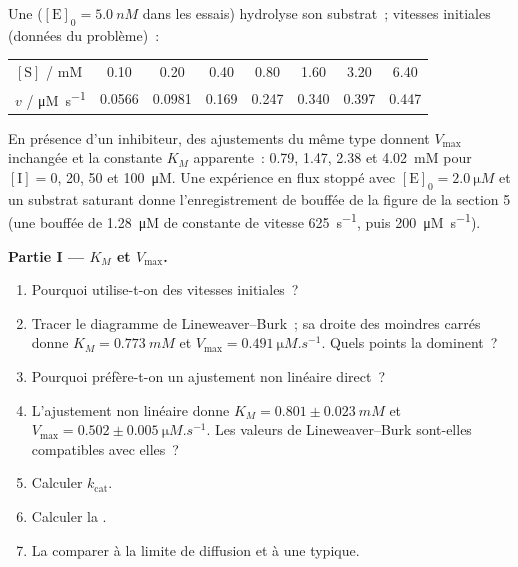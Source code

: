 \begin{problem}
\label{pb:b3:complex-kinetics:1}
Une  ($[\mathrm E]_0 = \qty{5.0}{nM}$ dans les essais) hydrolyse
son substrat~; vitesses initiales
(données du problème)~:
\begin{center}\small
\begin{tabular}{lccccccc}
\hline
$[\mathrm S]$ / mM & 0.10 & 0.20 & 0.40 & 0.80 & 1.60 & 3.20 & 6.40 \\
$v$ / \unit{\micro M.s^{-1}} & 0.0566 & 0.0981 & 0.169 & 0.247 & 0.340 & 0.397 & 0.447 \\ \hline
\end{tabular}
\end{center}
En présence d'un inhibiteur, des ajustements du même type donnent
$V_{\max}$ inchangée et
la constante $K_M$ apparente~: 0.79, 1.47, 2.38 et \qty{4.02}{mM} pour
$[\mathrm I] = 0$, 20, 50 et
\qty{100}{\micro M}. Une expérience en flux stoppé avec
$[\mathrm E]_0 = \qty{2.0}{\micro M}$ et un substrat saturant
donne l'enregistrement de bouffée de la figure de la section 5 (une
bouffée de \qty{1.28}{\micro M}
de constante de vitesse \qty{625}{s^{-1}}, puis \qty{200}{\micro M.s^{-1}}).

\medskip\noindent\textbf{Partie I --- $K_M$ et $V_{\max}$.}
\begin{enumerate}
  \item Pourquoi utilise-t-on des vitesses initiales~?
  \item Tracer le diagramme de Lineweaver--Burk~; sa droite des moindres
        carrés donne $K_M =
        \qty{0.773}{mM}$ et $V_{\max} = \qty{0.491}{\micro M.s^{-1}}$.
        Quels points la dominent~?
  \item Pourquoi préfère-t-on un ajustement non linéaire direct~?
  \item L'ajustement non linéaire donne $K_M = 0.801 \pm \qty{0.023}{mM}$ et $V_{\max} = 0.502 \pm
        \qty{0.005}{\micro M.s^{-1}}$. Les valeurs de Lineweaver--Burk
        sont-elles compatibles avec elles~?
  \item Calculer $k_{\mathrm{cat}}$.
  \item Calculer la .
  \item La comparer à la limite de diffusion et à une  typique.
\end{enumerate}


\end{problem}
